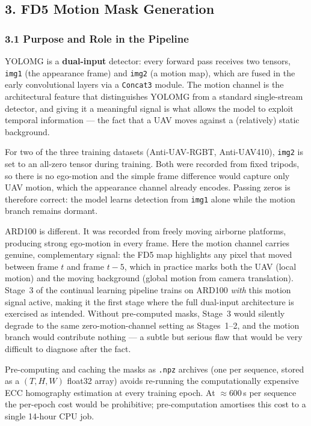 \subsection*{3. FD5 Motion Mask Generation}

\subsubsection*{3.1 Purpose and Role in the Pipeline}

YOLOMG is a \textbf{dual-input} detector: every forward pass receives
two tensors, \texttt{img1} (the appearance frame) and \texttt{img2}
(a motion map), which are fused in the early convolutional layers via
a \texttt{Concat3} module. The motion channel is the architectural
feature that distinguishes YOLOMG from a standard single-stream
detector, and giving it a meaningful signal is what allows the model
to exploit temporal information — the fact that a UAV moves against a
(relatively) static background.

For two of the three training datasets (Anti-UAV-RGBT, Anti-UAV410),
\texttt{img2} is set to an all-zero tensor during training. Both were
recorded from fixed tripods, so there is no ego-motion and the simple
frame difference would capture only UAV motion, which the appearance
channel already encodes. Passing zeros is therefore correct: the model
learns detection from \texttt{img1} alone while the motion branch
remains dormant.

ARD100 is different. It was recorded from freely moving airborne
platforms, producing strong ego-motion in every frame. Here the motion
channel carries genuine, complementary signal: the FD5 map highlights
any pixel that moved between frame $t$ and frame $t-5$, which in
practice marks both the UAV (local motion) and the moving background
(global motion from camera translation). Stage~3 of the continual
learning pipeline trains on ARD100 \emph{with} this motion signal
active, making it the first stage where the full dual-input
architecture is exercised as intended. Without pre-computed masks,
Stage~3 would silently degrade to the same zero-motion-channel
setting as Stages~1--2, and the motion branch would contribute
nothing — a subtle but serious flaw that would be very difficult to
diagnose after the fact.

Pre-computing and caching the masks as \texttt{.npz} archives
(one per sequence, stored as a $(T, H, W)$ float32 array) avoids
re-running the computationally expensive ECC homography estimation
at every training epoch. At $\approx$600\,s per sequence the
per-epoch cost would be prohibitive; pre-computation amortises
this cost to a single 14-hour CPU job.

